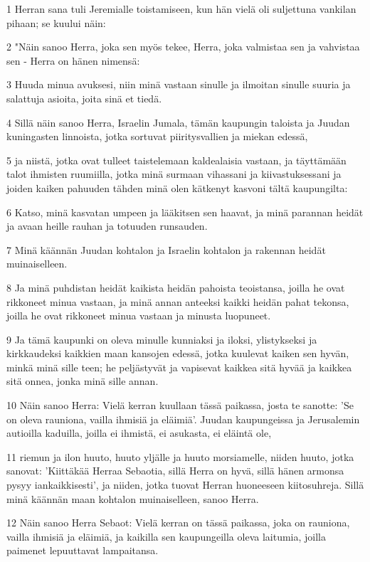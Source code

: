 \par 1 Herran sana tuli Jeremialle toistamiseen, kun hän vielä oli suljettuna vankilan pihaan; se kuului näin:
\par 2 "Näin sanoo Herra, joka sen myös tekee, Herra, joka valmistaa sen ja vahvistaa sen - Herra on hänen nimensä:
\par 3 Huuda minua avuksesi, niin minä vastaan sinulle ja ilmoitan sinulle suuria ja salattuja asioita, joita sinä et tiedä.
\par 4 Sillä näin sanoo Herra, Israelin Jumala, tämän kaupungin taloista ja Juudan kuningasten linnoista, jotka sortuvat piiritysvallien ja miekan edessä,
\par 5 ja niistä, jotka ovat tulleet taistelemaan kaldealaisia vastaan, ja täyttämään talot ihmisten ruumiilla, jotka minä surmaan vihassani ja kiivastuksessani ja joiden kaiken pahuuden tähden minä olen kätkenyt kasvoni tältä kaupungilta:
\par 6 Katso, minä kasvatan umpeen ja lääkitsen sen haavat, ja minä parannan heidät ja avaan heille rauhan ja totuuden runsauden.
\par 7 Minä käännän Juudan kohtalon ja Israelin kohtalon ja rakennan heidät muinaiselleen.
\par 8 Ja minä puhdistan heidät kaikista heidän pahoista teoistansa, joilla he ovat rikkoneet minua vastaan, ja minä annan anteeksi kaikki heidän pahat tekonsa, joilla he ovat rikkoneet minua vastaan ja minusta luopuneet.
\par 9 Ja tämä kaupunki on oleva minulle kunniaksi ja iloksi, ylistykseksi ja kirkkaudeksi kaikkien maan kansojen edessä, jotka kuulevat kaiken sen hyvän, minkä minä sille teen; he peljästyvät ja vapisevat kaikkea sitä hyvää ja kaikkea sitä onnea, jonka minä sille annan.
\par 10 Näin sanoo Herra: Vielä kerran kuullaan tässä paikassa, josta te sanotte: 'Se on oleva rauniona, vailla ihmisiä ja eläimiä'. Juudan kaupungeissa ja Jerusalemin autioilla kaduilla, joilla ei ihmistä, ei asukasta, ei eläintä ole,
\par 11 riemun ja ilon huuto, huuto yljälle ja huuto morsiamelle, niiden huuto, jotka sanovat: 'Kiittäkää Herraa Sebaotia, sillä Herra on hyvä, sillä hänen armonsa pysyy iankaikkisesti', ja niiden, jotka tuovat Herran huoneeseen kiitosuhreja. Sillä minä käännän maan kohtalon muinaiselleen, sanoo Herra.
\par 12 Näin sanoo Herra Sebaot: Vielä kerran on tässä paikassa, joka on rauniona, vailla ihmisiä ja eläimiä, ja kaikilla sen kaupungeilla oleva laitumia, joilla paimenet lepuuttavat lampaitansa.
